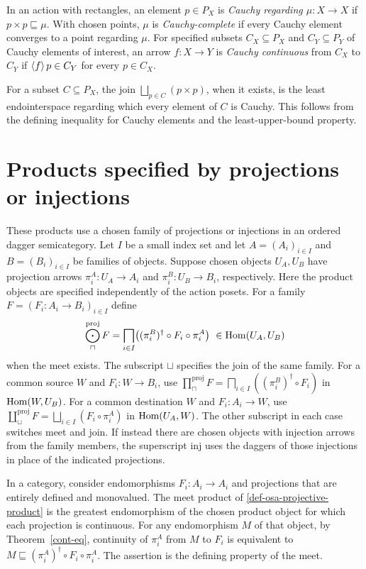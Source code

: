 \begin{defn}\label{def-osa-cauchy}
In an action with rectangles, an element $p\in P_X$ is
\emph{Cauchy regarding $\mu:X\to X$} if $p\times p\sqsubseteq\mu$.
With chosen points, $\mu$ is \emph{Cauchy-complete} if every
Cauchy element converges to a point regarding $\mu$.
For specified subsets $C_X\subseteq P_X$ and $C_Y\subseteq P_Y$
of Cauchy elements of interest, an arrow $f:X\to Y$ is
\emph{Cauchy continuous} from $C_X$ to $C_Y$ if
$\left\langle f\right\rangle p\in C_Y$ for every $p\in C_X$.
\end{defn}

For a subset $C\subseteq P_X$, the join
$\bigsqcup_{p\in C}(p\times p)$, when it exists, is the least
endointerspace regarding which every element of $C$ is Cauchy.
This follows from the defining inequality for Cauchy elements
and the least-upper-bound property.

\section[Projection and injection products]{Products specified by projections or injections}
\label{sec-osa-projection-products}

These products use a chosen family of projections or injections
in an ordered dagger semicategory. Let $I$ be a small index set
and let $A=(A_i)_{i\in I}$ and $B=(B_i)_{i\in I}$ be families of
objects. Suppose chosen objects $U_A,U_B$ have projection arrows
$\pi_i^A:U_A\to A_i$ and $\pi_i^B:U_B\to B_i$, respectively.
Here the product objects are specified independently of the action
posets. For a family $F=(F_i:A_i\to B_i)_{i\in I}$ define
\begin{equation}\label{def-osa-projective-product}
 \bigodot^{\mathrm{proj}}_{\sqcap}F=
 \bigsqcap_{i\in I}\bigl((\pi_i^B)^\dagger\circ F_i\circ\pi_i^A\bigr)
 \ \in\operatorname{Hom}(U_A,U_B)
\end{equation}
when the meet exists. The subscript $\sqcup$ specifies the
join of the same family. For a common source $W$ and
$F_i:W\to B_i$, use
$\prod^{\mathrm{proj}}_{\sqcap}F=
\bigsqcap_{i\in I}((\pi_i^B)^\dagger\circ F_i)$ in $\operatorname{Hom}(W,U_B)$.
For a common destination $W$ and $F_i:A_i\to W$, use
$\coprod^{\mathrm{proj}}_{\sqcup}F=
\bigsqcup_{i\in I}(F_i\circ\pi_i^A)$ in $\operatorname{Hom}(U_A,W)$.
The other subscript in each case switches meet and join.
If instead there are chosen objects with injection arrows from
the family members, the superscript $\mathrm{inj}$ uses the
daggers of those injections in place of the indicated projections.

In a category, consider endomorphisms $F_i:A_i\to A_i$ and
projections that are entirely defined and monovalued. The meet
product of \eqref{def-osa-projective-product} is the greatest
endomorphism of the chosen product object for which each
projection is continuous. For any endomorphism $M$ of that
object, by Theorem~\ref{cont-eq}, continuity of $\pi_i^A$ from
$M$ to $F_i$ is equivalent to
$M\sqsubseteq(\pi_i^A)^\dagger\circ F_i\circ\pi_i^A$.
The assertion is the defining property of the meet.
